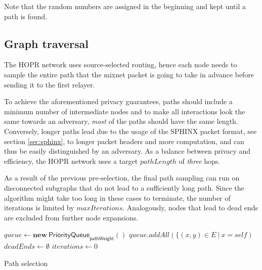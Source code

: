 Note that the random numbers are assigned in the beginning and kept until a path is found.

\subsection{Graph traversal}
\label{sec:path-selection:graph-traversal}

The HOPR network uses source-selected routing, hence each node needs to sample the entire path that the mixnet packet is going to take in advance before sending it to the first relayer.

To achieve the aforementioned privacy guarantees, paths should include a minimum number of intermediate nodes and to make all interactions look the same towards an adversary, \textit{most} of the paths should have the same length. Conversely, longer paths lead due to the usage of the SPHINX packet format, see section \ref{sec:sphinx}, to longer packet headers and more computation, and can thus be easily distinguished by an adversary. As a balance between privacy and efficiency, the HOPR network uses a target $pathLength$ of \textit{three} hops.

As a result of the previous pre-selection, the final path sampling can run on disconnected subgraphs that do not lead to a sufficiently long path. Since the algorithm might take too long in these cases to terminate, the number of iterations is limited by ${maxIterations}$. Analogously, nodes that lead to dead ends are excluded from further node expansions.

\begin{algorithm}[H]
    \SetAlgoNoLine
    \DontPrintSemicolon
    $queue \leftarrow \mathbf{new} \ \mathsf{PriorityQueue}_{\textsf{pathWeight}}()$\;
    $queue.addAll(\{ (x,y) \in E \ | \ x = self)$\;
    $deadEnds \leftarrow \emptyset$\;
    $iterations \leftarrow 0$\;
    \;
    \caption{Path selection}
\end{algorithm}